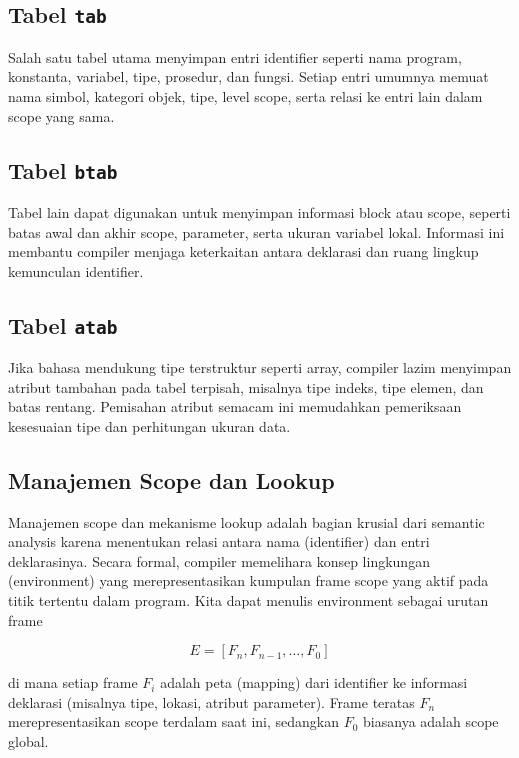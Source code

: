 \subsection{Tabel \protect\texttt{tab}}
Salah satu tabel utama menyimpan entri identifier seperti nama program, konstanta, variabel, tipe, prosedur, dan fungsi. Setiap entri umumnya memuat nama simbol, kategori objek, tipe, level scope, serta relasi ke entri lain dalam scope yang sama.

\subsection{Tabel \protect\texttt{btab}}
Tabel lain dapat digunakan untuk menyimpan informasi block atau scope, seperti batas awal dan akhir scope, parameter, serta ukuran variabel lokal. Informasi ini membantu compiler menjaga keterkaitan antara deklarasi dan ruang lingkup kemunculan identifier.

\subsection{Tabel \protect\texttt{atab}}
Jika bahasa mendukung tipe terstruktur seperti array, compiler lazim menyimpan atribut tambahan pada tabel terpisah, misalnya tipe indeks, tipe elemen, dan batas rentang. Pemisahan atribut semacam ini memudahkan pemeriksaan kesesuaian tipe dan perhitungan ukuran data.

\subsection{Manajemen Scope dan Lookup}
Manajemen scope dan mekanisme lookup adalah bagian krusial dari semantic analysis karena menentukan relasi antara nama (identifier) dan entri deklarasinya. Secara formal, compiler memelihara konsep lingkungan (environment) yang merepresentasikan kumpulan frame scope yang aktif pada titik tertentu dalam program. Kita dapat menulis environment sebagai urutan frame

$$
    E = [F_n, F_{n-1}, \dots, F_0]
$$

di mana setiap frame $F_i$ adalah peta (mapping) dari identifier ke informasi deklarasi (misalnya tipe, lokasi, atribut parameter). Frame teratas $F_n$ merepresentasikan scope terdalam saat ini, sedangkan $F_0$ biasanya adalah scope global.

